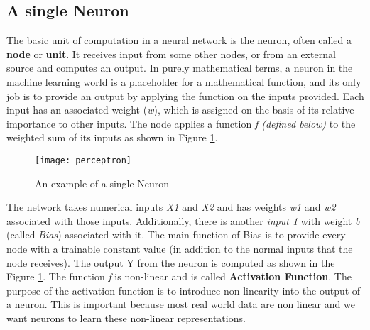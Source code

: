 \subsection{A single Neuron}
The basic unit of computation in a neural network is the neuron, often called a \textbf{node} or \textbf{unit}. It receives input from some
other nodes, or from an external source and computes an output. In purely mathematical terms, a neuron in the machine learning world is a
placeholder for a mathematical function, and its only job is to provide an output by applying the function on the inputs provided.
Each input has an associated weight (\textit{w}), which is assigned on the basis of its relative importance to other inputs. The node applies
a function \textit{f  (defined below)} to the weighted sum of its inputs as shown in Figure \ref{fig:Perceptron}.
\begin{figure}[h]
  \centering
  \texttt{[image: perceptron]}
  \caption{An example of a single Neuron}
  \label{fig:Perceptron}
\end{figure}
The network takes numerical inputs \textit{X1} and \textit{X2} and has weights \textit{w1} and \textit{w2} associated with those inputs.
Additionally, there is another \textit{input 1} with weight \textit{b} (called \textit{Bias}) associated with it. The main function of Bias is to provide every node with a trainable constant value (in addition to the normal inputs that the node receives). The output Y from the neuron
is computed as shown in the Figure \ref{fig:Perceptron}. The function \textit{f} is non-linear and is called \textbf{Activation Function}. The
purpose of the activation function is to introduce non-linearity into the output of a neuron. This is important because most real world data
are non linear and we want neurons to learn these non-linear representations.
